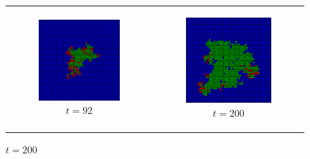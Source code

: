\begin{figure}
\begin{center}
	\begin{tabular}{c c}
		\begin{subfigure}[b]{0.4\textwidth}
			\centering
			\includegraphics[width=.6\textwidth, angle=0]{./../shared/fig/SIR_spatial_52x52_92time.png}
			\caption{$t = 92$}
			\label{fig:sir_spatial_92}
		\end{subfigure}

		& 

		\begin{subfigure}[b]{0.4\textwidth}
			\centering
			\includegraphics[width=.6\textwidth, angle=0]{./../shared/fig/SIR_spatial_52x52_200time.png}
			\caption{$t = 200$}
			\label{fig:sir_spatial_200}
		\end{subfigure}

		\\
		

\end{tabular}
\end{center}
\end{figure}
